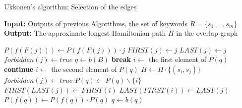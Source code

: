 \documentclass[english,twoside,censored,csm,algorithms-track-2020]{HYthesisML}
\theoremstyle{plain}
\theoremstyle{definition}
\begin{document}
  \begin{algorithm}[!ht]
    \caption{Ukkonen's algorithm: Selection of the edges} \label{ukk-h}
    \hspace*{\algorithmicindent} \textbf{Input:} Outputs of previous Algorithms, the set of keywords $R=\{s_1,...,s_m\}$ \\
    \hspace*{\algorithmicindent} \textbf{Output:} The approximate longest Hamiltonian path $H$ in the overlap graph
    \begin{algorithmic}[1]
            \State $P(f(F(j)))\gets P(f(F(j)))\cdot {j}$
            \State $FIRST(j)\gets j$
            \State $LAST(j)\gets j$
          \Else
            \State $forbidden(j)\gets true$
          \EndIf
        \EndFor  
        \State $q\gets b(B)$
               \footnotemark[1]
                \State \textbf{break}
              \EndIf
              \State $i\gets$ the first element of $P(q)$
                  \State \textbf{continue}
                \Else
                  \State $i\gets$ the second element of $P(q)$
                \EndIf
              \EndIf  
              \State $H\gets H\cdot \{(s_i,s_j)\}$
              \State $forbidden(j)\gets true$
              \State $P(q)\gets P(q) \backslash\{i\}$
              \State $FIRST(LAST(j))\gets FIRST(i)$
              \State $LAST(FIRST(i))\gets LAST(j)$
            \EndFor
          \State $P(f(q))\gets P(f(q))\cdot P(q)$
          \EndIf
          \State $q\gets b(q)$
        \EndWhile
      \EndFunction
    \end{algorithmic}
  \end{algorithm}
\end{document}

